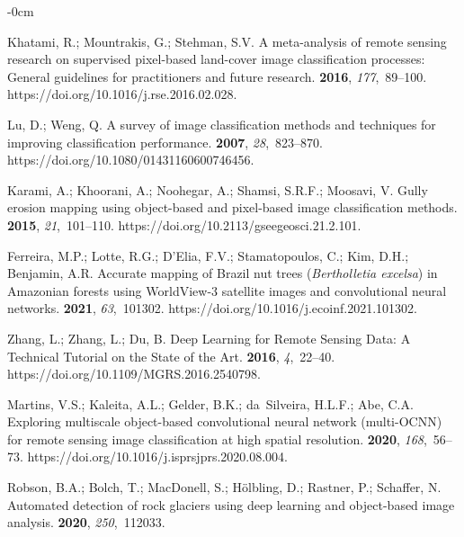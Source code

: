 \documentclass[remotesensing,article,accept,pdftex,moreauthors]{Definitions/mdpi}
\begin{document}
\begin{adjustwidth}{-\extralength}{0cm}
\begin{thebibliography}{999}
Khatami, R.; Mountrakis, G.; Stehman, S.V.
\newblock A meta-analysis of remote sensing research on supervised pixel-based
  land-cover image classification processes: General guidelines for
  practitioners and future research.
 {\bf 2016}, {\em 177},~89--100.
\newblock https://doi.org/10.1016/j.rse.2016.02.028.

Lu, D.; Weng, Q.
\newblock A survey of image classification methods and techniques for improving
  classification performance.
 {\bf 2007}, {\em
  28},~823--870. https://doi.org/10.1080/01431160600746456.

Karami, A.; Khoorani, A.; Noohegar, A.; Shamsi, S.R.F.; Moosavi, V.
\newblock Gully erosion mapping using object-based and pixel-based image
  classification methods.
 {\bf 2015}, {\em
  21},~101--110.
\newblock https://doi.org/10.2113/gseegeosci.21.2.101.

Ferreira, M.P.; Lotte, R.G.; D'Elia, F.V.; Stamatopoulos, C.; Kim, D.H.;
  Benjamin, A.R.
\newblock Accurate mapping of Brazil nut trees (\emph{Bertholletia excelsa}) in
  Amazonian forests using WorldView-3 satellite images and convolutional neural
  networks.
 {\bf 2021}, {\em 63},~101302.
\newblock https://doi.org/10.1016/j.ecoinf.2021.101302.

Zhang, L.; Zhang, L.; Du, B.
\newblock Deep Learning for Remote Sensing Data: A Technical Tutorial on the
  State of the Art.
 {\bf 2016}, {\em
  4},~22--40.
\newblock https://doi.org/10.1109/MGRS.2016.2540798.

Martins, V.S.; Kaleita, A.L.; Gelder, B.K.; da~Silveira, H.L.F.; Abe, C.A.
\newblock Exploring multiscale object-based convolutional neural network
  (multi-OCNN) for remote sensing image classification at high spatial
  resolution.
 {\bf 2020},
  {\em 168},~56--73.
\newblock https://doi.org/10.1016/j.isprsjprs.2020.08.004.

Robson, B.A.; Bolch, T.; MacDonell, S.; Hölbling, D.; Rastner, P.; Schaffer,
  N.
\newblock Automated detection of rock glaciers using deep learning and
  object-based image analysis.
 {\bf 2020}, {\em 250},~112033.


\end{thebibliography}
\end{adjustwidth}
\end{document}
